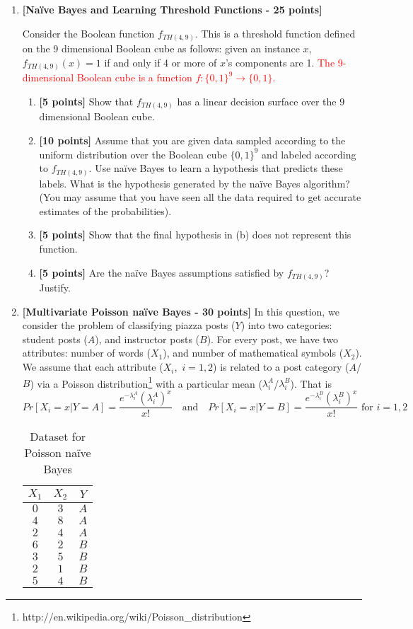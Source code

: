 \begin{enumerate}
\item {\bf [Na\"ive Bayes and Learning Threshold Functions - 25 points]}

Consider the Boolean function $f_{TH(4,9)}$.  This is a threshold function
defined on the 9 dimensional Boolean cube as follows: given an instance $x$,
$f_{TH(4,9)}(x) = 1$ if and only if 4 or more of $x$'s components are 1. \textcolor{red}{The 9-dimensional Boolean cube is a function $f: \{0,1\}^9 \rightarrow \{0,1\}$.}
\begin{enumerate}
\item {\bf [5 points]} Show that $f_{TH(4,9)}$ has a linear decision surface over the 
$9$ dimensional Boolean cube.
\item {\bf [10 points]}
Assume that you are given data sampled according to the uniform distribution
over the Boolean cube $\{0, 1\}^9$ and labeled according to $f_{TH(4,9)}$.
Use na\"ive Bayes to learn a hypothesis that predicts these labels.  What is
the hypothesis generated by the na\"ive Bayes algorithm?  (You may assume that
you have seen all the data required to get accurate estimates of the
probabilities).
\item {\bf [5 points]}
Show that the final hypothesis in (b) does not represent this function.
\item {\bf [5 points]}
Are the na\"ive Bayes assumptions satisfied by $f_{TH(4,9)}$?  Justify.
\end{enumerate}

\item {\bf [Multivariate Poisson na\"ive Bayes - 30 points]}
In this question, we consider the problem of classifying piazza posts ($Y$) into two categories: student posts ($A$), and instructor posts ($B$). For every post, we have two attributes: number of words ($X_1$), and number of mathematical symbols ($X_2$). We assume that each attribute ($X_i$,\ $i=1,2$) is related to a post category ($A$/$B$) via a Poisson distribution\footnote{http://en.wikipedia.org/wiki/Poisson\_distribution} with a particular mean ($\lambda^A_i$/$\lambda^B_i$). That is 
\[ Pr[X_i=x | Y = A] = \frac{e^{-\lambda^A_i} (\lambda^A_i)^x }{x!} ~~~\text{ and } ~~~ Pr[X_i=x | Y = B] = \frac{e^{-\lambda^B_i} (\lambda^B_i)^x }{x!} \text{ for } i =1,2 \]

\begin{table}[!h]
\begin{center}
\begin{tabular}{|c|c|c|}
\hline
$X_1$ & $X_2$ & $Y$ \\
\hline
$0$ & $3$ & $A$ \\
$4$ & $8$ & $A$ \\
$2$ & $4$ & $A$ \\
$6$ & $2$ & $B$ \\
$3$ & $5$ & $B$ \\
$2$ & $1$ & $B$ \\
$5$ & $4$ & $B$ \\
\hline
\end{tabular}
\caption{Dataset for Poisson na\"ive Bayes}
\label{tab:p1}
\end{center}
\end{table}


\end{enumerate}
